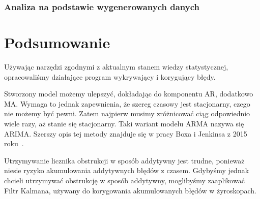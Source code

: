 \subsubsection{Analiza na podstawie wygenerowanych danych}




\section{Podsumowanie}
Używając narzędzi zgodnymi z aktualnym stanem wiedzy statystycznej, opracowaliśmy działające program wykrywający i korygujący błędy.

Stworzony model możemy ulepszyć, dokładając do komponentu AR, dodatkowo MA. Wymaga to jednak zapewnienia, że szereg czasowy jest stacjonarny, czego nie możemy być pewni.
Zatem najpierw musimy zróżnicować ciąg odpowiednio wiele razy, aż stanie się stacjonarny.
Taki wariant modelu ARMA nazywa się ARIMA\@.
Szerszy opis tej metody znajduje się w pracy Boxa i Jenkinsa z 2015 roku~\cite{arima}.

Utrzymywanie licznika obstrukcji w sposób addytywny jest trudne, ponieważ niesie ryzyko akumulowania addytywnych błędów z czasem.
Gdybyśmy jednak chcieli utrzymywać obstrukcję w sposób addytywny, moglibyśmy zaaplikować Filtr Kalmana, używany do korygowania akumulowanych błędów w żyroskopach.